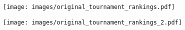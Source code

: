 \blankscreen{}
\begin{frame}{}
    \begin{figure}
      \texttt{[image: images/original\_tournament\_rankings.pdf]}
    \end{figure}
\end{frame}

\begin{frame}{}
    \begin{figure}
      \texttt{[image: images/original\_tournament\_rankings\_2.pdf]}
    \end{figure}
\end{frame}
